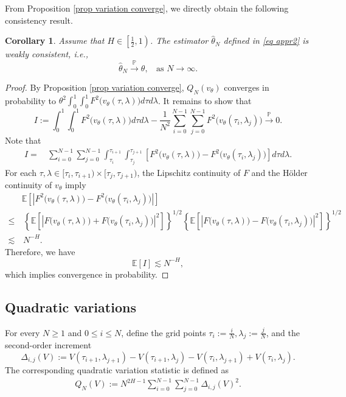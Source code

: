 \documentclass[11pt,reqno]{amsart}
\numberwithin{equation}{section}
\newtheorem{corollary}[theorem]{Corollary}
\newcommand{\1}{{\bf 1}}
\newcommand{\2}{{\bf 2}}
\begin{document}
   From Proposition  \ref{prop variation converge}, we directly obtain the   following  consistency result. 
  \begin{corollary}\label{coro est}  Assume that $H\in \left[\frac12, 1\right)$. 
 The estimator $  \hat \theta_N$ defined in  \eqref{eq appr2} is weakly consistent, i.e., 
$$ \hat \theta_N \stackrel{\mathbb P}{\longrightarrow}   \theta,  \ \ \ \ \text{as } N\rightarrow\infty.
 $$
\end{corollary}
      \begin{proof}
By Proposition  \ref{prop variation converge},  $Q_{N}(v_{\theta})$ converges in probability to  $ \theta^2 \int_0^1\int_0^1 F^2\big(v_{\theta}(\tau, \lambda)\big)d\tau d\lambda$. It remains to show that 
$$
I:=    \int_0^1\int_0^1 F^2\big(v_{\theta}(\tau, \lambda)\big)d\tau d\lambda  -\frac{1}{N^2} \sum_{i=0}^{N-1} \sum_{j=0}^{N-1} F^2\big(v_{\theta}(\tau_i, \lambda_j) \big) \stackrel{\mathbb P}{\longrightarrow} 0.
 $$
Note that 
   \begin{align*}
I= & \,   \sum_{i=0}^{N-1} \sum_{j=0}^{N-1}   \int_{\tau_i}^{\tau_{i+1}}\int_{\tau_j}^{\tau_{j+1}} \left[ F^2\big(v_{\theta}(\tau, \lambda)\big)-F^2\big(v_{\theta}(\tau_i, \lambda_j) \big)\right]d\tau d\lambda.
 \end{align*}
 For each $\tau, \lambda\in  [\tau_i, \tau_{i+1}) \times [\tau_j, \tau_{j+1})$, the   Lipschitz continuity of $F$ and the H\"older continuity of $v_{\theta}$ imply   
  \begin{align*}
& \mathbb E\left[    \left|F^2\big(v_{\theta}(\tau, \lambda)\big)-F^2\big(v_{\theta}(\tau_i, \lambda_j) \big)\right|  \right]\\
\le &\,       \left\{ \mathbb E\left[ \left|F\big(v_{\theta}(\tau, \lambda)\big)+F\big(v_{\theta}(\tau_i, \lambda_j) \big)\right|^2 \right]\right\}^{1/2}  \left\{ \mathbb E\left[ \left|F\big(v_{\theta}(\tau, \lambda)\big)-F\big(v_{\theta}(\tau_i, \lambda_j) \big)\right|^2\right]\right\}^{1/2}     \\
   \lesssim &\,   N^{-H}. 
 \end{align*}
Therefore,  we have
$$
\mathbb E\left[I \right] \lesssim N^{-H},
$$
which implies convergence in probability.  
\end{proof}
   
  
  \subsection{Quadratic  variations} \label{Sec QV}
  For every $N\ge1$ and $0\le i\le N$, define the grid points
   $\tau_i:=\frac{i}{N}, \lambda_j:=\frac{j}{N}$,   and the second-order increment
  $$
\Delta_{i,j}(V) := V\left(\tau_{i+1}, \lambda_{j+1}  \right)-V\left(\tau_{i+1}, \lambda_{j}\right)-V\left(\tau_{i}, \lambda_{j+1}  \right) +V\left(\tau_{i}, \lambda_{j}    \right).
$$
  The corresponding quadratic variation statistic is defined as 
   \begin{align}\label{eq V V}
Q_{N}(V):= N^{2H-1}\sum_{i=0}^{N-1}\sum_{j=0}^{N-1}\Delta_{i,j}(V)^2.
\end{align}
\end{document}
